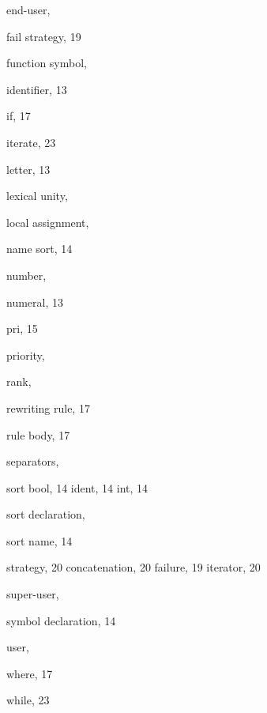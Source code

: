 \begin{theindex}
  \indexspace

  \item end-user, 

  \indexspace

  \item fail
    \subitem strategy, 19
  \item function symbol, 

  \indexspace

  \item identifier, 13
  \item if, 17
  \item iterate, 23

  \indexspace

  \item letter, 13
  \item lexical unity, 
  \item local assignment, 

  \indexspace

  \item name
    \subitem sort, 14
  \item number, 
  \item numeral, 13

  \indexspace

  \item pri, 15
  \item priority, 

  \indexspace

  \item rank, 
  \item rewriting rule, 17
  \item rule body, 17

  \indexspace

  \item separators, 
  \item sort
    \subitem bool, 14
    \subitem ident, 14
    \subitem int, 14
  \item sort declaration, 
  \item sort name, 14
  \item strategy, 20
    \subitem concatenation, 20
    \subitem failure, 19
    \subitem iterator, 20
  \item super-user, 
  \item symbol declaration, 14

  \indexspace

  \item user, 

  \indexspace

  \item where, 17
  \item while, 23

\end{theindex}
